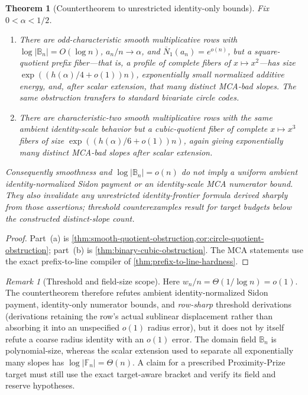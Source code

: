 \documentclass[12pt,a4paper]{amsart}
\numberwithin{equation}{section}
\newtheorem{theorem}{Theorem}[section]
\theoremstyle{remark}
\newtheorem{remark}[remark]{Remark}
\newcommand{\F}{\mathbb F}
\newcommand{\B}{\mathbb B}
\newcommand{\barN}{\overline N}
\newcommand{\abs}[1]{\lvert #1\rvert}
\begin{document}
\begin{theorem}[Countertheorem to unrestricted identity-only bounds]
\label{thm:intro-countertheorem}
Fix \(0<\alpha<1/2\).
\begin{enumerate}[label=\textup{(\alph*)},leftmargin=*]
\item There are odd-characteristic smooth multiplicative rows with
      \(\log|\B_n|=O(\log n)\), \(a_n/n\to\alpha\), and
      \(\barN_1(a_n)=e^{o(n)}\), but a square-quotient prefix fiber---that
      is, a profile of complete fibers of \(x\mapsto x^2\)---has size
      \(\exp((h(\alpha)/4+o(1))n)\), exponentially small normalized
      additive energy, and, after scalar extension, that many distinct
      MCA-bad slopes.  The same obstruction transfers to standard
      bivariate circle codes.
\item There are characteristic-two smooth multiplicative rows with the
      same ambient identity-scale behavior but a cubic-quotient fiber of
      complete \(x\mapsto x^3\) fibers of size
      \(\exp((h(\alpha)/6+o(1))n)\), again giving exponentially many
      distinct MCA-bad slopes after scalar extension.
\end{enumerate}
Consequently smoothness and \(\log|\B_n|=o(n)\) do not imply a uniform
ambient identity-normalized Sidon payment or an identity-scale MCA
numerator bound.  They also invalidate any unrestricted identity-frontier
formula derived sharply from those assertions; threshold counterexamples result
for target budgets below the constructed distinct-slope count.
\end{theorem}

\begin{proof}
Part~\textup{(a)} is
\cref{thm:smooth-quotient-obstruction,cor:circle-quotient-obstruction};
part~\textup{(b)} is
\cref{thm:binary-cubic-obstruction}.  The MCA statements use the exact
prefix-to-line compiler of \cref{thm:prefix-to-line-hardness}.
\end{proof}

\begin{remark}[Threshold and field-size scope]
\label{rem:intro-countertheorem-scope}
Here \(w_n/n=\Theta(1/\log n)=o(1)\).  The countertheorem therefore
refutes ambient identity-normalized Sidon payment, identity-only numerator
bounds, and \emph{row-sharp} threshold derivations (derivations retaining
the row's actual sublinear displacement rather than absorbing it into an
unspecified \(o(1)\) radius error), but it does not by itself
refute a coarse radius identity with an \(o(1)\) error.  The domain field
\(\B_n\) is polynomial-size, whereas the scalar extension used to separate
all exponentially many slopes has \(\log\abs{\F_n}=\Theta(n)\).  A claim
for a prescribed Proximity-Prize target must still use the exact
target-aware bracket and verify its field and reserve hypotheses.
\end{remark}
\end{document}
